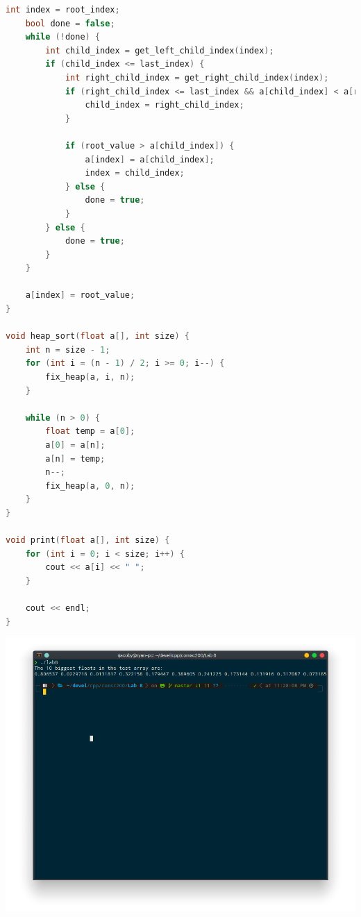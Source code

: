 \documentclass[letterpaper, 11pt]{article}
\begin{document}
\begin{lstlisting}[language=c++, caption=main.cpp]
    int index = root_index;
    bool done = false;
    while (!done) {
        int child_index = get_left_child_index(index);
        if (child_index <= last_index) {
            int right_child_index = get_right_child_index(index);
            if (right_child_index <= last_index && a[child_index] < a[right_child_index]) {
                child_index = right_child_index;
            }

            if (root_value > a[child_index]) {
                a[index] = a[child_index];
                index = child_index;
            } else {
                done = true;
            }
        } else {
            done = true;
        }
    }

    a[index] = root_value;
}

void heap_sort(float a[], int size) {
    int n = size - 1;
    for (int i = (n - 1) / 2; i >= 0; i--) {
        fix_heap(a, i, n);
    }
    
    while (n > 0) {
        float temp = a[0];
        a[0] = a[n];
        a[n] = temp;
        n--;
        fix_heap(a, 0, n);
    }
}

void print(float a[], int size) {
    for (int i = 0; i < size; i++) {
        cout << a[i] << " ";
    }

    cout << endl;
}    
\end{lstlisting}

\includegraphics[scale=0.5]{floats.png}
\end{document}
